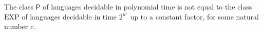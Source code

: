 \begin{theorem}
\label{Complexity.P_ne_EXP}
\leanok
{}
The class $\mathsf{P}$ of languages decidable in polynomial time is not equal to the
class $\mathrm{EXP}$ of languages decidable in time $2^{n^c}$ up to a constant factor,
for some natural number $c$.
\end{theorem}
